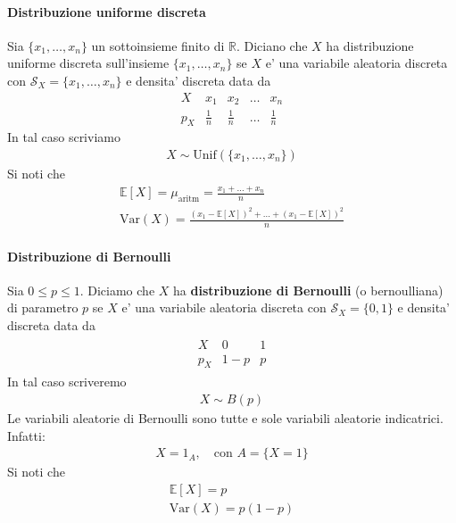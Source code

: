 \documentclass[a4paper,12pt]{article}
\begin{document}
\paragraph{Distribuzione uniforme discreta} Sia $\{x_1, \dots, x_n\}$ un sottoinsieme finito di $\mathbb{R}$. Diciano che $X$ ha distribuzione uniforme discreta sull'insieme $\{x_1, \dots, x_n\}$ se $X$ e' una variabile aleatoria discreta con $\mathcal{S}_X = \{x_1, \dots, x_n\}$ e densita' discreta data da
\[
\begin{array}{c|c|c|c|c}
X & x_1 & x_2 & \dots & x_n \\
p_X & \frac{1}{n} & \frac{1}{n} & \dots & \frac{1}{n}
\end{array}
\]
In tal caso scriviamo
\begin{align*}
  X \sim \text{Unif}(\{x_1, \dots, x_n\})
\end{align*}
Si noti che 
\begin{align*}
  \mathbb{E}[X] = \mu_\text{aritm} = \frac{x_1 + \dots + x_n}{n}\\
  \text{Var}(X) = \frac{(x_1 - \mathbb{E}[X])^2 + \dots + (x_1 - \mathbb{E}[X])^2}{n}
\end{align*}
\paragraph{Distribuzione di Bernoulli} Sia $0 \leq p \leq 1$. Diciamo che $X$ ha \textbf{distribuzione di Bernoulli} (o bernoulliana) di parametro $p$ se $X$ e' una variabile aleatoria discreta con $\mathcal{S}_X=\{0,1\}$ e densita' discreta data da
\begin{align*}
  \begin{array}{c|c|c}
  X & 0 & 1 \\
  \hline
  p_X & 1-p & p
  \end{array}
\end{align*}
In tal caso scriveremo
\begin{align*}
  X \sim B(p)
\end{align*}
Le variabili aleatorie di Bernoulli sono tutte e sole variabili aleatorie indicatrici. Infatti:
\begin{align*}
  X = 1_A, \quad \text{con } A =\{X = 1\}
\end{align*}
Si noti che 
\begin{align*}
  \mathbb{E}[X] = p\\
  \text{Var}(X) = p(1-p)
\end{align*}
\end{document}
